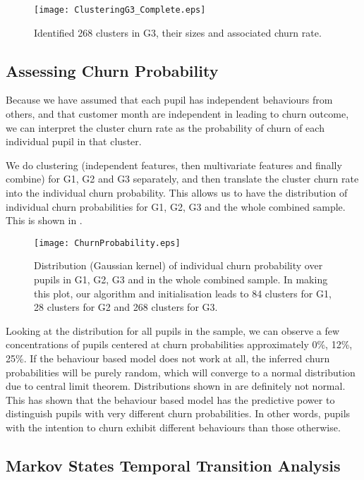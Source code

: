 \begin{figure}[!h]
\centering
\texttt{[image: ClusteringG3\_Complete.eps]}
\caption{Identified 268 clusters in G3, their sizes and associated churn rate.}
\label{fig:clusteringG3Complete}
\end{figure}

\subsection{Assessing Churn Probability}

Because we have assumed that each pupil has independent behaviours from others, and that customer month are independent in leading to churn outcome, we can interpret the cluster churn rate as the probability of churn of each individual pupil in that cluster.

We do clustering (independent features, then multivariate features and finally combine) for G1, G2 and G3 separately, and then translate the cluster churn rate into the individual churn probability. This allows us to have the distribution of individual churn probabilities for G1, G2, G3 and the whole combined sample. This is shown in .

\begin{figure}[!h]
\centering
\texttt{[image: ChurnProbability.eps]}
\caption{Distribution (Gaussian kernel) of individual churn probability over pupils in G1, G2, G3 and in the whole combined sample. In making this plot, our algorithm and initialisation leads to 84 clusters for G1, 28 clusters for G2 and 268 clusters for G3.}
\label{fig:churnProb}
\end{figure}

Looking at the distribution for all pupils in the sample, we can observe a few concentrations of pupils centered at churn probabilities approximately 0\%, 12\%, 25\%. If the behaviour based model does not work at all, the inferred churn probabilities will be purely random, which will converge to a normal distribution due to central limit theorem. Distributions shown in  are definitely not normal. This has shown that the behaviour based model has the predictive power to distinguish pupils with very different churn probabilities. In other words, pupils with the intention to churn exhibit different behaviours than those otherwise.

\subsection{Markov States Temporal Transition Analysis}

